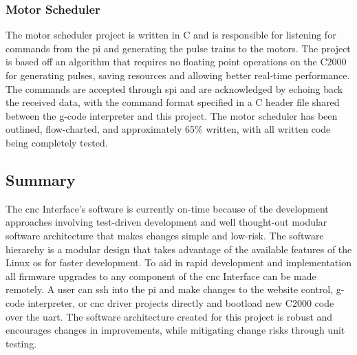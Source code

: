 \subsubsection{Motor Scheduler}
The motor scheduler project is written in C and is responsible for listening for commands from the \gls{pi} and generating the pulse trains to the motors.
The project is based off an algorithm that requires no floating point operations on the C2000 for generating pulses, saving resources and allowing better real-time performance.
The commands are accepted through \gls{spi} and are acknowledged by echoing back the received data, with the command format specified in a C header file shared between the g-code interpreter and this project.
The motor scheduler has been outlined, flow-charted, and approximately 65\% written, with all written code being completely tested.

\subsection{Summary}
The \gls{cnc} Interface's software is currently on-time because of the development approaches involving test-driven development and well thought-out modular software architecture that makes changes simple and low-risk.
The software hierarchy is a modular design that takes advantage of the available features of the Linux \gls{os} for faster development.
To aid in rapid development and implementation all firmware upgrades to any component of the \gls{cnc} Interface can be made remotely.
A user can \gls{ssh} into the \gls{pi} and make changes to the website control, g-code interpreter, or \gls{cnc} driver projects directly and bootload new C2000 code over the \gls{uart}.
The software architecture created for this project is robust and encourages changes in improvements, while mitigating change risks through unit testing.
